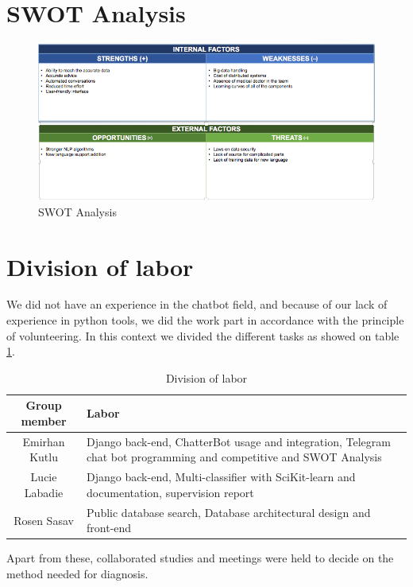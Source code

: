 \section{SWOT Analysis}

\begin{figure}[H]
	\centering
	\includegraphics[width=\textwidth]{swot}
	\caption{SWOT Analysis}
	\label{swot}
\end{figure}

\section{Division of labor}

We did not have an experience in the chatbot field, and because of our lack of experience in python	tools, we did the work part in accordance with the principle of volunteering. In this context we divided the different tasks as showed on table \ref{labor}.
\begin{table}[H]
	\centering
	\begin{tabular}{|c|p{10cm}|}
		\hline
		\textbf{Group member} & \textbf{Labor} \\
		\hline
		Emirhan	Kutlu & Django back-end, ChatterBot usage and integration, Telegram chat bot programming and competitive and SWOT Analysis \\
		\hline
		Lucie Labadie & Django back-end, Multi-classifier with SciKit-learn and documentation, supervision report \\
		\hline
		Rosen Sasav & Public database search, Database architectural design and front-end \\
		\hline
	\end{tabular}
	\caption{Division of labor}
	\label{labor}
\end{table}	

Apart from these, collaborated studies and meetings	were held to decide on the method needed for diagnosis.